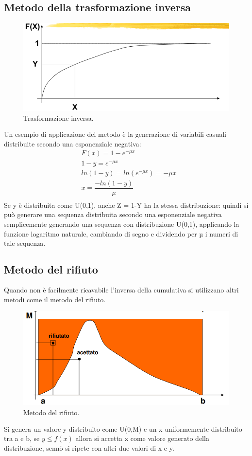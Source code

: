 \subsection{Metodo della trasformazione inversa}
\begin{figure}[H]
	\centering
    \includegraphics[width=15cm, keepaspectratio]{img/trasformazione_inversa.png}
	\caption{Trasformazione inversa.}\label{fig:trasformazione_inversa}
\end{figure}
Un esempio di applicazione del metodo è la generazione di variabili
casuali distribuite secondo una esponenziale negativa:
\begin{align*}
    & F(x) = 1 - e^{-\mu x} \\
    & 1-y = e^{- \mu x} \\
    & ln(1-y) = ln(e^{-\mu x}) = -\mu x\\
    & x = \dfrac{- ln(1-y)}{\mu}\\ 
\end{align*}
Se y è distribuita come U(0,1), anche Z = 1-Y ha la stessa distribuzione: quindi si può generare una sequenza distribuita secondo una esponenziale negativa semplicemente generando una sequenza con distribuzione U(0,1), applicando la funzione logaritmo naturale, cambiando di segno e dividendo per µ i numeri di tale sequenza.

\subsection{Metodo del rifiuto}
Quando non è facilmente ricavabile l'inversa della cumulativa si utilizzano altri metodi come il metodo del rifiuto.
\begin{figure}[H]
	\centering
    \includegraphics[width=15cm, keepaspectratio]{img/metodo_rifiuto.png}
	\caption{Metodo del rifiuto.}\label{fig:metodo_rifiuto}
\end{figure}
Si genera un valore y distribuito come U(0,M) e un x uniformemente distribuito tra a e b, se $y \leq f(x)$ allora si accetta x come valore generato della distribuzione, sennò si ripete con altri due valori di x e y.


